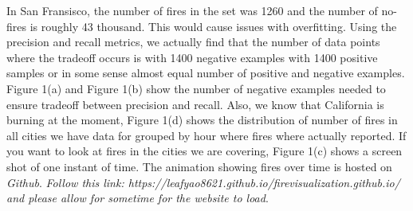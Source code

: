 \documentclass[10pt]{article}
\begin{document}
In San Fransisco, the number of fires in the set was 1260 and the number of
no-fires is roughly 43 thousand. This would cause issues with overfitting.
Using the precision and recall metrics, we actually find that the number of
data points where the tradeoff occurs is with 1400 negative examples with 1400
positive samples or in some sense almost equal number of positive and negative
examples. Figure 1(a) and Figure 1(b) show the number of negative examples
needed to ensure tradeoff between precision and recall. Also, we know that
California is burning at the moment, Figure 1(d) shows the distribution of
number of fires in all cities we have data for grouped by hour where fires
where actually reported. If you want to look at fires in the cities we are
covering, Figure 1(c) shows a screen shot of one instant of time. The animation
showing fires over time is hosted on \textit{Github}.
\textit{Follow this link:
https://leafyao8621.github.io/firevisualization.github.io/
and please allow for sometime for the website to load}.\par
\end{document}
